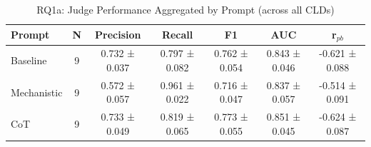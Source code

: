 \begin{table}[htbp]
\centreing
\caption{RQ1a: Judge Performance Aggregated by Prompt (across all CLDs)}
\label{tab:rq1a_by_prompt}
\begin{tabular}{lcccccc}
\toprule
\textbf{Prompt} & \textbf{N} & \textbf{Precision} & \textbf{Recall} & \textbf{F1} & \textbf{AUC} & \textbf{r$_{pb}$} \\
\midrule
Baseline & 9 & 0.732 ± 0.037 & 0.797 ± 0.082 & 0.762 ± 0.054 & 0.843 ± 0.046 & -0.621 ± 0.088 \\
Mechanistic & 9 & 0.572 ± 0.057 & 0.961 ± 0.022 & 0.716 ± 0.047 & 0.837 ± 0.057 & -0.514 ± 0.091 \\
CoT & 9 & 0.733 ± 0.049 & 0.819 ± 0.065 & 0.773 ± 0.055 & 0.851 ± 0.045 & -0.624 ± 0.087 \\
\bottomrule
\end{tabular}
\end{table}